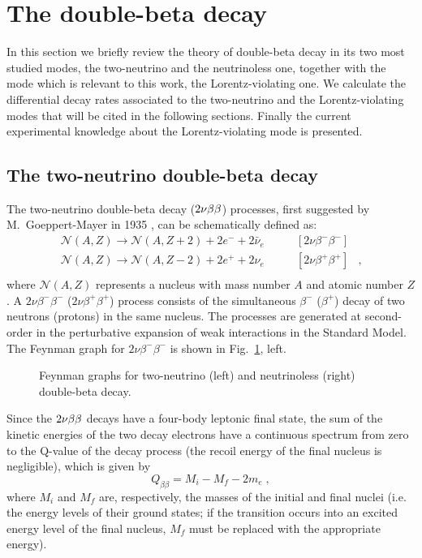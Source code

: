 \section{The double-beta decay}\label{sec:theory}
In this section we briefly review the theory of double-beta decay in its two most studied modes, the two-neutrino and the neutrinoless one, together with the mode which is relevant to this work, the Lorentz-violating one. We calculate the differential decay rates associated to the two-neutrino and the Lorentz-violating modes that will be cited in the following sections. Finally the current experimental knowledge about the Lorentz-violating mode is presented.
\subsection*{The two-neutrino double-beta decay}
The two-neutrino double-beta decay ($2\nu\beta\beta$) processes, first suggested by M.~Goeppert-Mayer in 1935 \cite{PhysRev.48.512}, can be schematically defined as:
\[\begin{array}{lrl}
		\mathcal{N}(A,Z)\longrightarrow \mathcal{N}(A,Z+2)+2e^-+2\bar{\nu}_e & \qquad [2\nu\beta^-\beta^-] & \\
		\mathcal{N}(A,Z)\longrightarrow \mathcal{N}(A,Z-2)+2e^++2\nu_e & \qquad [2\nu\beta^+\beta^+] & ,\\
\end{array}\]
where $\mathcal{N}(A,Z)$ represents a nucleus with mass number $A$ and atomic number $Z$. A $2\nu\beta^-\beta^-$ ($2\nu\beta^+\beta^+$) process consists of the simultaneous $\beta^-$ ($\beta^+$) decay of two neutrons (protons) in the same nucleus. The processes are generated at second-order in the perturbative expansion of weak interactions in the Standard Model. The Feynman graph for $2\nu\beta^-\beta^-$ is shown in Fig.~\ref{fig:nbbfey}, left.
\begin{figure}[b]
	\centering%
	\caption{Feynman graphs for two-neutrino (left) and neutrinoless (right) double-beta decay.}
	\label{fig:nbbfey}
\end{figure}

Since the $2\nu\beta\beta$ decays have a four-body leptonic final state, the sum of the kinetic energies of the two decay electrons have a continuous spectrum from zero to the Q-value of the decay process (the recoil energy of the final nucleus is negligible), which is given by
\begin{equation}Q_{\beta\beta}=M_i-M_f-2m_e\;,\end{equation}
where $M_i$ and $M_f$ are, respectively, the masses of the initial and final nuclei (i.e. the energy levels of their ground states; if the transition occurs into an excited energy level of the final nucleus, $M_f$ must be replaced with the appropriate energy).

